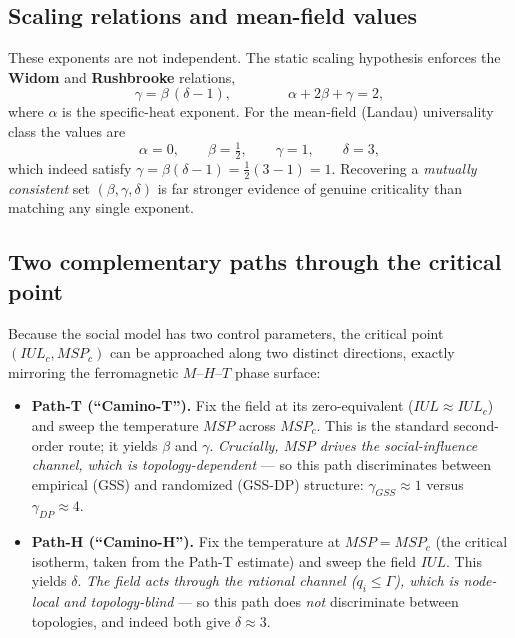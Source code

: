 \documentclass[11pt]{article}
\begin{document}
\subsection{Scaling relations and mean-field values}
These exponents are not independent. The static scaling hypothesis enforces the \textbf{Widom} and \textbf{Rushbrooke} relations,
\begin{equation}
    \gamma = \beta\,(\delta - 1), \qquad\qquad \alpha + 2\beta + \gamma = 2 ,
\end{equation}
where $\alpha$ is the specific-heat exponent. For the mean-field (Landau) universality class the values are
\begin{equation}
    \alpha = 0, \qquad \beta = \tfrac{1}{2}, \qquad \gamma = 1, \qquad \delta = 3 ,
\end{equation}
which indeed satisfy $\gamma = \beta(\delta-1) = \tfrac12(3-1) = 1$. Recovering a \emph{mutually consistent} set $(\beta,\gamma,\delta)$ is far stronger evidence of genuine criticality than matching any single exponent.

\subsection{Two complementary paths through the critical point}
Because the social model has two control parameters, the critical point $(IUL_c, MSP_c)$ can be approached along two distinct directions, exactly mirroring the ferromagnetic $M$--$H$--$T$ phase surface:

\begin{itemize}
    \item \textbf{Path-T (``Camino-T'').} Fix the field at its zero-equivalent ($IUL \approx IUL_c$) and sweep the temperature $MSP$ across $MSP_c$. This is the standard second-order route; it yields $\beta$ and $\gamma$. \emph{Crucially, $MSP$ drives the social-influence channel, which is topology-dependent} — so this path discriminates between empirical (GSS) and randomized (GSS-DP) structure: $\gamma_{GSS}\approx 1$ versus $\gamma_{DP}\approx 4$.
    \item \textbf{Path-H (``Camino-H'').} Fix the temperature at $MSP = MSP_c$ (the critical isotherm, taken from the Path-T estimate) and sweep the field $IUL$. This yields $\delta$. \emph{The field acts through the rational channel ($q_i \le \Gamma$), which is node-local and topology-blind} — so this path does \emph{not} discriminate between topologies, and indeed both give $\delta \approx 3$.
\end{itemize}
\end{document}
